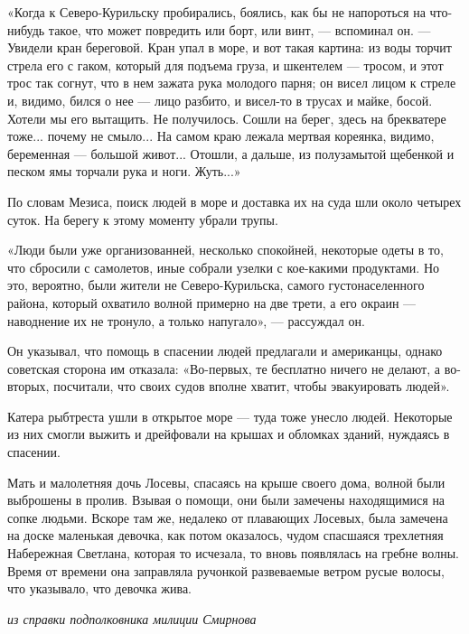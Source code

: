«Когда к Северо-Курильску пробирались, боялись, как бы не напороться на что-нибудь такое, что может повредить или борт, или винт, --- вспоминал он. --- Увидели кран береговой. Кран упал в море, и вот такая картина: из воды торчит стрела его с гаком, который для подъема груза, и шкентелем --- тросом, и этот трос так согнут, что в нем зажата рука молодого парня; он висел лицом к стреле и, видимо, бился о нее --- лицо разбито, и висел-то в трусах и майке, босой. Хотели мы его вытащить. Не получилось. Сошли на берег, здесь на брекватере тоже... почему не смыло... На самом краю лежала мертвая кореянка, видимо, беременная --- большой живот... Отошли, а дальше, из полузамытой щебенкой и песком ямы торчали рука и ноги. Жуть...»

По словам Мезиса, поиск людей в море и доставка их на суда шли около четырех суток. На берегу к этому моменту убрали трупы.

«Люди были уже организованней, несколько спокойней, некоторые одеты в то, что сбросили с самолетов, иные собрали узелки с кое-какими продуктами. Но это, вероятно, были жители не Северо-Курильска, самого густонаселенного района, который охватило волной примерно на две трети, а его окраин --- наводнение их не тронуло, а только напугало», --- рассуждал он.

Он указывал, что помощь в спасении людей предлагали и американцы, однако советская сторона им отказала: «Во-первых, те бесплатно ничего не делают, а во-вторых, посчитали, что своих судов вполне хватит, чтобы эвакуировать людей».

Катера рыбтреста ушли в открытое море --- туда тоже унесло людей. Некоторые из них смогли выжить и дрейфовали на крышах и обломках зданий, нуждаясь в спасении.

\begin{fancyquotes}
    Мать и малолетняя дочь Лосевы, спасаясь на крыше своего дома, волной были выброшены в пролив. Взывая о помощи, они были замечены находящимися на сопке людьми. Вскоре там же, недалеко от плавающих Лосевых, была замечена на доске маленькая девочка, как потом оказалось, чудом спасшаяся трехлетняя Набережная Светлана, которая то исчезала, то вновь появлялась на гребне волны. Время от времени она заправляла ручонкой развеваемые ветром русые волосы, что указывало, что девочка жива.\\

    \begin{flushright}
        \it
        из справки подполковника милиции Смирнова
    \end{flushright}
\end{fancyquotes}

